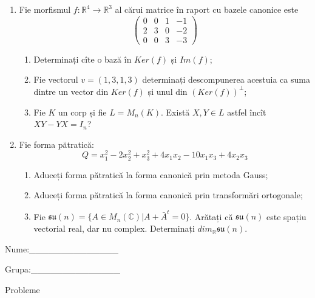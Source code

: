 \documentclass{article}
\begin{document}
\begin{enumerate}
 \item Fie morfismul $f:\mathbb{R}^4 \to \mathbb{R}^3$ al cărui matrice în raport cu bazele canonice este
$$\begin{pmatrix}
0&0&1&-1\\
2&3&0&-2\\
0&0&3&-3
\end{pmatrix}$$

\begin{enumerate}
\item Determinați cîte o bază în $Ker(f)$ și $Im(f)$;
\item Fie vectorul $v=(1,3,1,3)$ determinați descompunerea acestuia ca suma dintre un vector din $Ker(f)$ și unul din $(Ker(f))^\perp$;
\item Fie $K$ un corp și fie $L=M_n(K)$. Există $X,Y \in L$ astfel încît $XY-YX=I_n$?  
\end{enumerate}
\item Fie forma pătratică:
$$Q= x_1^2-2x_2^2+x_3^2+4x_1x_2-10x_1x_3+4x_2x_3$$

\begin{enumerate}
\item Aduceți forma pătratică la forma canonică prin metoda Gauss;
\item Aduceți forma pătratică la forma canonică prin transformări ortogonale;
\item Fie $\mathfrak{su}(n)=\{ A \in M_n(\mathbb{C}) | A+\bar{A}^t=0\}$. Arătați că $\mathfrak{su}(n)$ este spațiu vectorial real, dar nu complex.
Determinați $dim_{\mathbb{R}}\mathfrak{su}(n)$.
\end{enumerate}
\end{enumerate}
\newpage
\begin{flushright}
Nume:\_\_\_\_\_\_\_\_\_\_\_\_\_\_
 
 
Grupa:\_\_\_\_\_\_\_\_\_\_\_\_\_\_
\end{flushright}
\begin{center}
\vspace{2cm}
{\Large Probleme}
\vspace{2cm}
\end{center}
\end{document}

